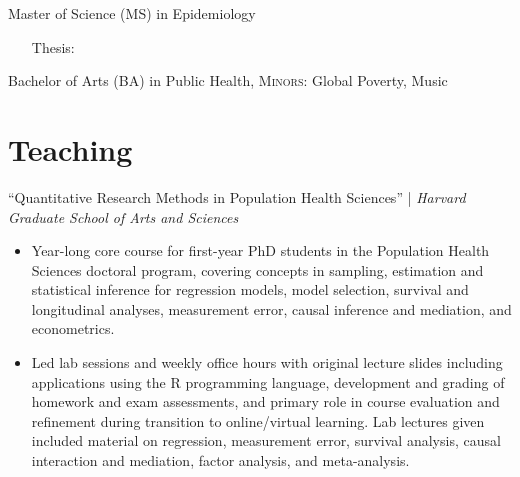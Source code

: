 \documentclass{cv_style}
\begin{document}
\parskip -4pt Master of Science (MS) in Epidemiology \\
    \vspace{-1em}
    \begingroup
    \addtolength{\leftmargini}{3em} \begin{itemize}
        \item[\hspace{1em}Thesis:] 
    \end{itemize}
    \endgroup
\parskip -8pt  

\parskip -4pt \noindent  Bachelor of Arts (BA) in Public Health, \textsc{Minors:} Global Poverty, Music


\parskip -5pt 
\section{Teaching}

``Quantitative Research Methods in Population Health Sciences'' | \textit{Harvard Graduate School of Arts and Sciences}
\begin{itemize}
  \vspace{0em} \item Year-long core course for first-year PhD students in the Population Health Sciences doctoral program, covering concepts in sampling, estimation and statistical inference for regression models, model selection, survival and longitudinal analyses, measurement error, causal inference and mediation, and econometrics. 
  \item \parskip 1pt Led lab sessions and weekly office hours with original lecture slides including applications using the R programming language, development and grading of homework and exam assessments, and primary role in course evaluation and refinement during transition to online/virtual learning. Lab lectures given included material on regression, measurement error, survival analysis, causal interaction and mediation, factor analysis, and meta-analysis.
\end{itemize}
\end{document}
